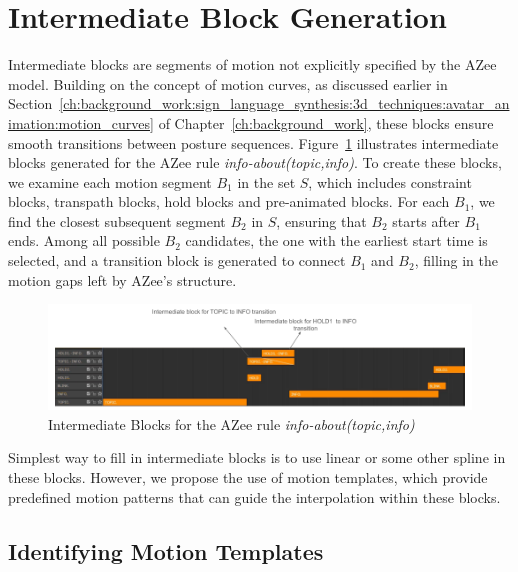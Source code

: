 \documentclass[../../main.tex]{subfiles}
\begin{document}
\section{Intermediate Block Generation}
\label{ch:intermediate_blocks_pose_correction:intermediate_block_generation}

Intermediate blocks are segments of motion not explicitly specified by the AZee model. Building on the concept of motion curves, as discussed earlier in Section~\ref{ch:background_work:sign_language_synthesis:3d_techniques:avatar_animation:motion_curves} of Chapter~\ref{ch:background_work}, these blocks ensure smooth transitions between posture sequences. Figure~\ref{fig:info_about_intermediate_example} illustrates intermediate blocks generated for the AZee rule \emph{info-about(topic,info)}. To create these blocks, we examine each motion segment \( B_1 \) in the set \( S \), which includes constraint blocks, transpath blocks, hold blocks and pre-animated blocks. For each \( B_1 \), we find the closest subsequent segment \( B_2 \) in \( S \), ensuring that \( B_2 \) starts after \( B_1 \) ends. Among all possible \( B_2 \) candidates, the one with the earliest start time is selected, and a transition block is generated to connect \( B_1 \) and \( B_2 \), filling in the motion gaps left by AZee’s structure.

\begin{figure}
    \centering \includegraphics[width = 5in]{chapters/intermediate_blocks_pose_correction/images/info_about_intermediate_example.png}
    \caption{Intermediate Blocks for the AZee rule \emph{info-about(topic,info)}}
    \label{fig:info_about_intermediate_example}
\end{figure}

Simplest way to fill in intermediate blocks is to use linear or some other spline in these blocks. However, we propose the use of motion templates, which provide predefined motion patterns that can guide the interpolation within these blocks.

\subsection{Identifying Motion Templates}
\label{ch:intermediate_blocks_pose_correction:identifying_motion_templates}
\end{document}
